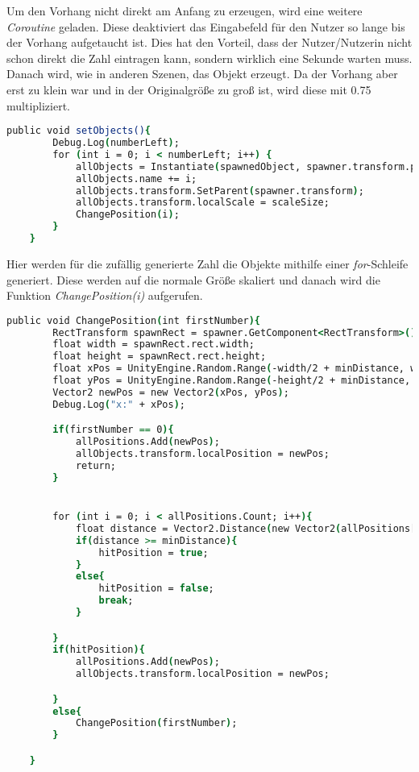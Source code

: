 Um den Vorhang nicht direkt am Anfang zu erzeugen, wird eine weitere \textit{Coroutine} geladen. Diese deaktiviert das Eingabefeld für den Nutzer so lange bis der Vorhang aufgetaucht ist. Dies hat den Vorteil, dass der Nutzer/Nutzerin nicht schon direkt die Zahl eintragen kann, sondern wirklich eine Sekunde warten muss. Danach wird, wie in anderen Szenen, das Objekt erzeugt. Da der Vorhang aber erst zu klein war und in der Originalgröße zu groß ist, wird diese mit 0.75 multipliziert.\\
\begin{lstlisting}[language=csh, caption={hideCircle.cs setObjects-Funktion}]
	public void setObjects(){
		Debug.Log(numberLeft);
		for (int i = 0; i < numberLeft; i++) {
			allObjects = Instantiate(spawnedObject, spawner.transform.position, Quaternion.identity);
			allObjects.name += i;
			allObjects.transform.SetParent(spawner.transform);
			allObjects.transform.localScale = scaleSize;
			ChangePosition(i);
		}
	}
\end{lstlisting}
Hier werden für die zufällig generierte Zahl die Objekte mithilfe einer \textit{for}-Schleife generiert. Diese werden auf die normale Größe skaliert und danach wird die Funktion \textit{ChangePosition(i)} aufgerufen.\\
\begin{lstlisting}[language=csh, caption={hideCircle.cs ChangePosition-Funktion}]
	public void ChangePosition(int firstNumber){
		RectTransform spawnRect = spawner.GetComponent<RectTransform>();
		float width = spawnRect.rect.width;
		float height = spawnRect.rect.height;
		float xPos = UnityEngine.Random.Range(-width/2 + minDistance, width/2 - minDistance);
		float yPos = UnityEngine.Random.Range(-height/2 + minDistance, height/2 - minDistance);
		Vector2 newPos = new Vector2(xPos, yPos);
		Debug.Log("x:" + xPos);

		if(firstNumber == 0){
			allPositions.Add(newPos);
			allObjects.transform.localPosition = newPos;
			return;
		}


		for (int i = 0; i < allPositions.Count; i++){
			float distance = Vector2.Distance(new Vector2(allPositions[i].x, allPositions[i].y), new Vector2(newPos.x, newPos.y));
			if(distance >= minDistance){
				hitPosition = true;
			}
			else{
				hitPosition = false;
				break;
			}

		}
		if(hitPosition){
			allPositions.Add(newPos);
			allObjects.transform.localPosition = newPos;

		}
		else{
			ChangePosition(firstNumber);
		}

	}
\end{lstlisting}
